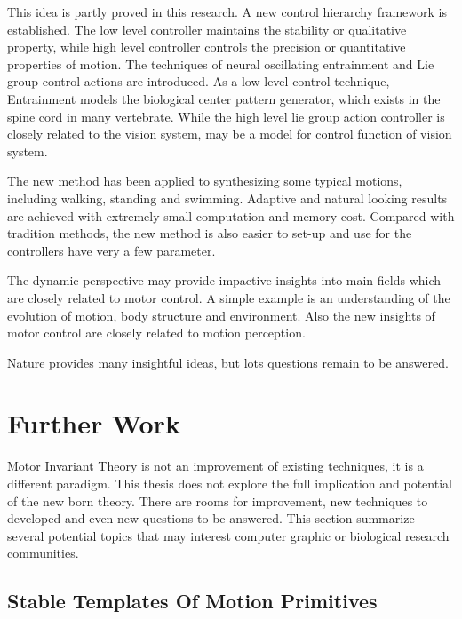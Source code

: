 This idea is partly proved in this research.
A new control hierarchy framework is established.
The low level controller maintains the stability or qualitative property,
while high level controller controls the precision or quantitative properties of motion.
The techniques of neural oscillating entrainment and Lie group control actions are introduced.
As a low level control technique, Entrainment  models the biological center pattern generator, which exists in the spine cord in many vertebrate.
While the high level lie group action controller is closely related to the vision system, may be a model for control function of vision system.


The new method has been applied to synthesizing some typical motions, including walking, standing and swimming.
Adaptive and natural looking results are achieved with extremely small computation and memory cost.
Compared with tradition methods, the new method is also easier to set-up and use for the controllers have very a few parameter.


The dynamic perspective may provide impactive insights into main fields which are closely related to motor control.
A simple example is an understanding of the evolution  of motion, body structure and environment.
Also the new insights of motor control are closely related to motion perception.

Nature provides many insightful ideas, but lots questions remain to be answered.













 




\section{Further Work}
Motor Invariant Theory is not an improvement of existing \cms techniques, it is a different paradigm.
This thesis does not explore the full implication and potential of the new born theory.
There are rooms for improvement, new techniques to developed and even new questions to be answered.
This section summarize several potential topics that may interest computer graphic  or biological research communities.

\subsection{Stable Templates Of Motion Primitives}

